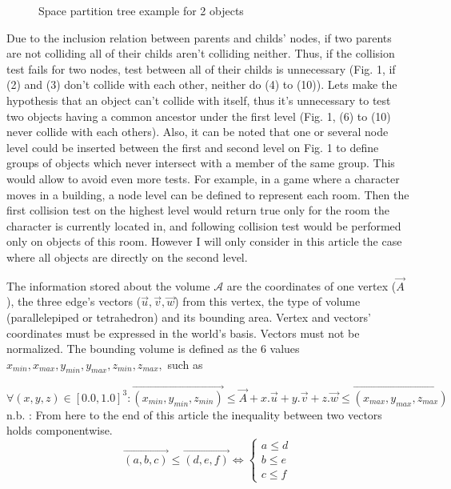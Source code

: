 \documentclass[12pt, a4paper]{article}
\begin{document}
\begin{figure}[h]
\begin{center}
\caption{Space partition tree example for 2 objects}
\end{center}
\end{figure}

Due to the inclusion relation between parents and childs' nodes, if two parents are not colliding all of their childs aren't colliding neither. Thus, if the collision test fails for two nodes, test between all of their childs is unnecessary (Fig. 1, if (2) and (3) don't collide with each other, neither do (4) to (10)). Lets make the hypothesis that an object can't collide with itself, thus it's unnecessary to test two objects having a common ancestor under the first level (Fig. 1, (6) to (10) never collide with each others). Also, it can be noted that one or several node level could be inserted between the first and second level on Fig. 1 to define groups of objects which never intersect with a member of the same group. This would allow to avoid even more tests. For example, in a game where a character moves in a building, a node level can be defined to represent each room. Then the first collision test on the highest level would return true only for the room the character is currently located in, and following collision test would be performed only on objects of this room. However I will only consider in this article the case where all objects are directly on the second level.

The information stored about the volume $\mathcal{A}$ are the coordinates of one vertex ($\overrightarrow{A}$), the three edge's vectors ($\overrightarrow{u}, \overrightarrow{v}, \overrightarrow{w}$) from this vertex, the type of volume (parallelepiped or tetrahedron) and its bounding area. Vertex and vectors' coordinates must be expressed in the world's basis. Vectors must not be normalized. The bounding volume is defined as the 6 values $x_{min}, x_{max}, y_{min}, y_{max}, z_{min}, z_{max},$ such as

\begin{displaymath}
\forall(x, y, z)\in[0.0, 1.0]^3:\overrightarrow{(x_{min}, y_{min}, z_{min})} \le \overrightarrow{A}+x.\overrightarrow{u}+y.\overrightarrow{v}+z.\overrightarrow{w} \le \overrightarrow{(x_{max}, y_{max}, z_{max})}
\end{displaymath}
n.b. : From here to the end of this article the inequality between two vectors holds componentwise.
\begin{displaymath}
\overrightarrow{(a, b, c)} \le \overrightarrow{(d, e, f)} \Leftrightarrow \left \{ \begin{array}{c} a \le d \\ b \le e \\ c \le f \end{array} \right.
\end{displaymath}
\end{document}
